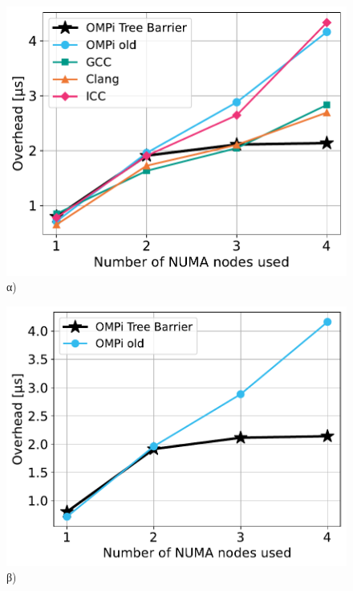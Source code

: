\begin{figure}[htbp]
    \centering
    \begin{minipage}{0.5\textwidth}
        \centering
        \includegraphics[width=1\textwidth]{Figures/parade-epcc/sockets_tpn-8_close.pdf}
		α)
    \end{minipage}\hfill
     \begin{minipage}{0.5\textwidth}
        \centering
        \includegraphics[width=1\textwidth]{Figures/parade-epcc/ompionly_sockets_tpn-8_close.pdf}
		β)
    \end{minipage}
    \newline
    \begin{minipage}{0.5\textwidth}

\end{minipage}
\end{figure}
